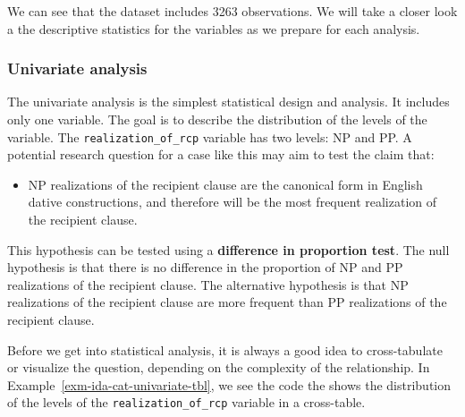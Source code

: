 \documentclass[
  letterpaper,
]{latex/krantz}
\providecommand{\tightlist}{%
  \setlength{\itemsep}{0pt}\setlength{\parskip}{0pt}}\usepackage{longtable,booktabs,array}
\theoremstyle{definition}
\theoremstyle{remark}
\begin{document}
We can see that the dataset includes 3263 observations. We will take a
closer look a the descriptive statistics for the variables as we prepare
for each analysis.

\subsubsection{Univariate analysis}\label{sec-ida-cat-univariate}

The univariate analysis is the simplest statistical design and analysis.
It includes only one variable. The goal is to describe the distribution
of the levels of the variable. The \texttt{realization\_of\_rcp}
variable has two levels: NP and PP. A potential research question for a
case like this may aim to test the claim that:

\begin{itemize}
\tightlist
\item
  NP realizations of the recipient clause are the canonical form in
  English dative constructions, and therefore will be the most frequent
  realization of the recipient clause.
\end{itemize}

This hypothesis can be tested using a \textbf{difference in proportion
test}. The null hypothesis is that there is no difference in the
proportion of NP and PP realizations of the recipient clause. The
alternative hypothesis is that NP realizations of the recipient clause
are more frequent than PP realizations of the recipient clause.

Before we get into statistical analysis, it is always a good idea to
cross-tabulate or visualize the question, depending on the complexity of
the relationship. In Example~\ref{exm-ida-cat-univariate-tbl}, we see
the code the shows the distribution of the levels of the
\texttt{realization\_of\_rcp} variable in a cross-table.
\end{document}
